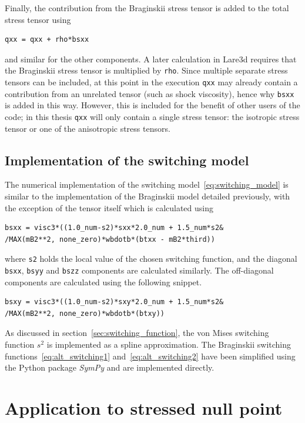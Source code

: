 Finally, the contribution from the Braginskii stress tensor is added to the total stress tensor using 
\begin{lstlisting}
qxx = qxx + rho*bsxx
\end{lstlisting}
and similar for the other components. A later calculation in Lare3d requires that the Braginskii stress tensor is multiplied by \verb|rho|. Since multiple separate stress tensors can be included, at this point in the execution \verb|qxx| may already contain a contribution from an unrelated tensor (such as shock viscosity), hence why \verb|bsxx| is added in this way. However, this is included for the benefit of other users of the code; in this thesis \verb|qxx| will only contain a single stress tensor: the isotropic stress tensor or one of the anisotropic stress tensors.

\subsection{Implementation of the switching model}

The numerical implementation of the switching model~\eqref{eq:switching_model} is similar to the implementation of the Braginskii model detailed previously, with the exception of the tensor itself which is calculated using
\begin{lstlisting}
bsxx = visc3*((1.0_num-s2)*sxx*2.0_num + 1.5_num*s2&
/MAX(mB2**2, none_zero)*wbdotb*(btxx - mB2*third))
\end{lstlisting}
where \verb|s2| holds the local value of the chosen switching function, and the diagonal \verb|bsxx|, \verb|bsyy| and \verb|bszz| components are calculated similarly. The off-diagonal components are calculated using the following snippet.
\begin{lstlisting}
bsxy = visc3*((1.0_num-s2)*sxy*2.0_num + 1.5_num*s2&
/MAX(mB2**2, none_zero)*wbdotb*(btxy))
\end{lstlisting}

As discussed in section~\ref{sec:switching_function}, the von Mises switching function $s^2$ is implemented as a spline approximation. The Braginskii switching functions~\eqref{eq:alt_switching1} and~\eqref{eq:alt_switching2} have been simplified using the Python package \emph{SymPy} and are implemented directly. 

\section{Application to stressed null point}

